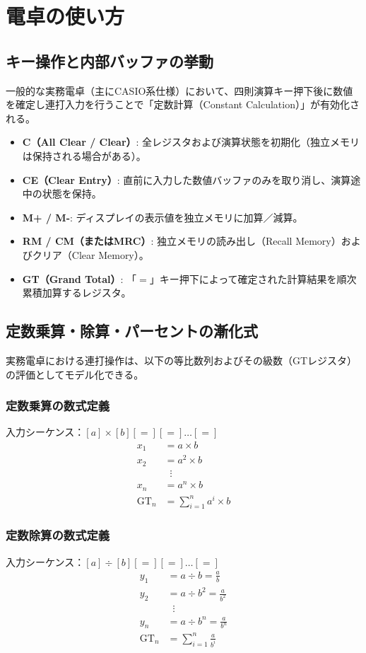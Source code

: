 \chapter{電卓の使い方}
\section{キー操作と内部バッファの挙動}
一般的な実務電卓（主にCASIO系仕様）において、四則演算キー押下後に数値を確定し連打入力を行うことで「定数計算（Constant Calculation）」が有効化される。

\begin{itemize}
    \item \textbf{C（All Clear / Clear）}: 全レジスタおよび演算状態を初期化（独立メモリは保持される場合がある）。
    \item \textbf{CE（Clear Entry）}: 直前に入力した数値バッファのみを取り消し、演算途中の状態を保持。
    \item \textbf{M+ / M-}: ディスプレイの表示値を独立メモリに加算／減算。
    \item \textbf{RM / CM（またはMRC）}: 独立メモリの読み出し（Recall Memory）およびクリア（Clear Memory）。
    \item \textbf{GT（Grand Total）}: 「$=$」キー押下によって確定された計算結果を順次累積加算するレジスタ。
\end{itemize}

\section{定数乗算・除算・パーセントの漸化式}
実務電卓における連打操作は、以下の等比数列およびその級数（GTレジスタ）の評価としてモデル化できる。

\subsection{定数乗算の数式定義}
入力シーケンス：$[a] \times [b] [=] [=] \dots [=]$
\begin{align}
    x_1 &= a \times b \\
    x_2 &= a^2 \times b \\
    &\;\;\vdots \nonumber \\
    x_n &= a^n \times b \\
    \text{GT}_n &= \sum_{i=1}^n a^i \times b
\end{align}

\subsection{定数除算の数式定義}
入力シーケンス：$[a] \div [b] [=] [=] \dots [=]$
\begin{align}
    y_1 &= a \div b = \frac{a}{b} \\
    y_2 &= a \div b^2 = \frac{a}{b^2} \\
    &\;\;\vdots \nonumber \\
    y_n &= a \div b^n = \frac{a}{b^n} \\
    \text{GT}_n &= \sum_{i=1}^n \frac{a}{b^i}
\end{align}

